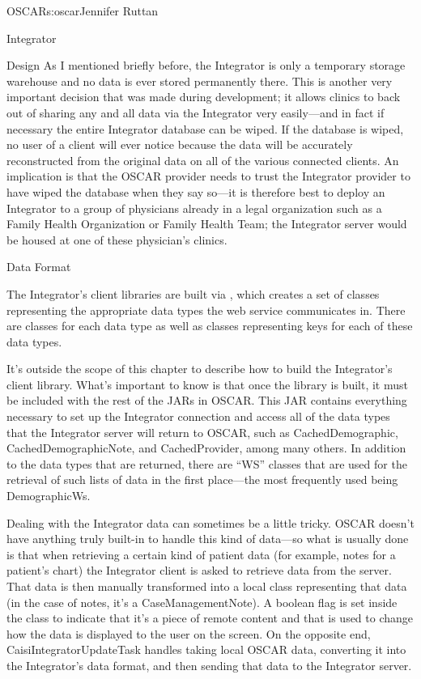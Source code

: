 \begin{aosachapter}{OSCAR}{s:oscar}{Jennifer Ruttan}
\begin{aosasect1}{Integrator}
\begin{aosasect2}{Design}
As I mentioned briefly before, the Integrator is only a temporary
storage warehouse and no data is ever stored permanently there. This
is another very important decision that was made during development;
it allows clinics to back out of sharing any and all data via the
Integrator very easily---and in fact if necessary the entire
Integrator database can be wiped. If the database is wiped, no user of
a client will ever notice because the data will be accurately
reconstructed from the original data on all of the various connected
clients. An implication is that the OSCAR provider needs to trust the
Integrator provider to have wiped the database when they say so---it
is therefore best to deploy an Integrator to a group of physicians
already in a legal organization such as a Family Health Organization
or Family Health Team; the Integrator server would be housed at one of
these physician's clinics.

\end{aosasect2}

\begin{aosasect2}{Data Format}

The Integrator's client libraries are built via , which
creates a set of classes representing the appropriate data types the
web service communicates in. There are classes for each data type as
well as classes representing keys for each of these data types.

It's outside the scope of this chapter to describe how to build the
Integrator's client library. What's important to know is that once the
library is built, it must be included with the rest of the JARs in
OSCAR. This JAR contains everything necessary to set up the Integrator
connection and access all of the data types that the Integrator server
will return to OSCAR, such as CachedDemographic,
CachedDemographicNote, and CachedProvider, among many others. In
addition to the data types that are returned, there are ``WS'' classes
that are used for the retrieval of such lists of data in the first
place---the most frequently used being DemographicWs.

Dealing with the Integrator data can sometimes be a little
tricky. OSCAR doesn't have anything truly built-in to handle this kind
of data---so what is usually done is that when retrieving a certain
kind of patient data (for example, notes for a patient's chart) the
Integrator client is asked to retrieve data from the server. That data
is then manually transformed into a local class representing that data
(in the case of notes, it's a CaseManagementNote). A boolean flag is
set inside the class to indicate that it's a piece of remote content
and that is used to change how the data is displayed to the user on
the screen. On the opposite end, CaisiIntegratorUpdateTask handles taking local
OSCAR data, converting it into the Integrator's data format, and then
sending that data to the Integrator server.


\end{aosasect2}
\end{aosasect1}
\end{aosachapter}

